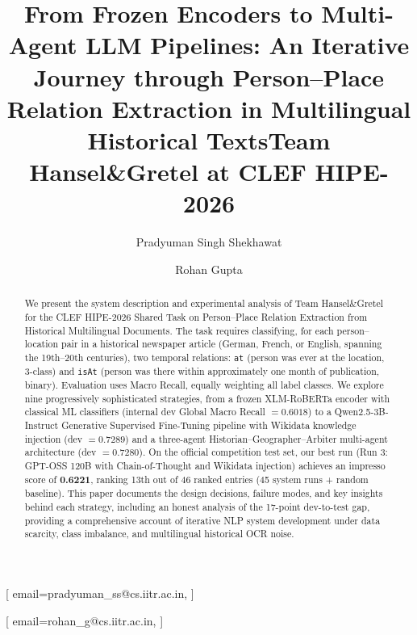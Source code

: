 \documentclass{ceurart}
\begin{document}


\title{From Frozen Encoders to Multi-Agent LLM Pipelines: An Iterative Journey through Person--Place Relation Extraction in Multilingual Historical Texts}

\title[mode=sub]{Team Hansel\&Gretel at CLEF HIPE-2026}

\author[1]{Pradyuman Singh Shekhawat}[%
  email=pradyuman_ss@cs.iitr.ac.in,
]
\cormark[1]

\author[1]{Rohan Gupta}[%
  email=rohan_g@cs.iitr.ac.in,
]

\address[1]{Indian Institute of Technology Roorkee, Roorkee, Uttarakhand 247667, India}


\begin{abstract}
We present the system description and experimental analysis of Team Hansel\&Gretel for the CLEF HIPE-2026 Shared Task on Person--Place Relation Extraction from Historical Multilingual Documents. The task requires classifying, for each person--location pair in a historical newspaper article (German, French, or English, spanning the 19th--20th centuries), two temporal relations: \texttt{at} (person was ever at the location, 3-class) and \texttt{isAt} (person was there within approximately one month of publication, binary). Evaluation uses Macro Recall, equally weighting all label classes. We explore nine progressively sophisticated strategies, from a frozen XLM-RoBERTa encoder with classical ML classifiers (internal dev Global Macro Recall $= 0.6018$) to a Qwen2.5-3B-Instruct Generative Supervised Fine-Tuning pipeline with Wikidata knowledge injection (dev $= 0.7289$) and a three-agent Historian--Geographer--Arbiter multi-agent architecture (dev $= 0.7280$). On the official competition test set, our best run (Run 3: GPT-OSS 120B with Chain-of-Thought and Wikidata injection) achieves an impresso score of \textbf{0.6221}, ranking 13th out of 46 ranked entries (45 system runs + random baseline). This paper documents the design decisions, failure modes, and key insights behind each strategy, including an honest analysis of the 17-point dev-to-test gap, providing a comprehensive account of iterative NLP system development under data scarcity, class imbalance, and multilingual historical OCR noise.
\end{abstract}
\end{document}
